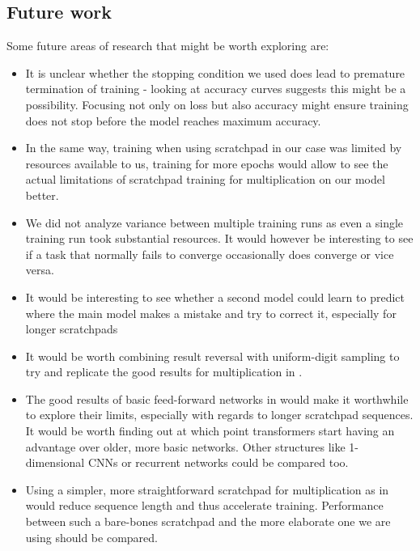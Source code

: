 \subsection{Future work}

Some future areas of research that might be worth exploring are:

\begin{itemize}
\item It is unclear whether the stopping condition we used does lead to premature termination of training - looking at accuracy curves suggests this might be a possibility. Focusing not only on loss but also accuracy might ensure training does not stop before the model reaches maximum accuracy.

\item In the same way, training when using scratchpad in our case was limited by resources available to us, training for more epochs would allow to see the actual limitations of scratchpad training for multiplication on our model better.

\item We did not analyze variance between multiple training runs as even a single training run took substantial resources. It would however be interesting to see if a task that normally fails to converge occasionally does converge or vice versa.

\item It would be interesting to see whether a second model could learn to predict where the main model makes a mistake and try to correct it, especially for longer scratchpads

\item It would be worth combining result reversal with uniform-digit sampling to try and replicate the good  results for multiplication in \cite{positionmatters}.

\item The good results of basic feed-forward networks in \cite{visual} would make it worthwhile to explore their limits, especially with regards to longer scratchpad sequences. It would be worth finding out at which point transformers start having an advantage over older, more basic networks. Other structures like 1-dimensional CNNs or recurrent networks could be compared too.

\item Using a simpler, more straightforward scratchpad for multiplication as in \cite{implicit} would reduce sequence length and thus accelerate training. Performance between such a bare-bones scratchpad and the more elaborate one we are using should be compared.


\end{itemize}
